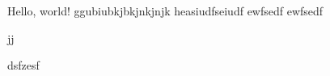 \documentclass{article}
\begin{document}
Hello, world!
ggubiubkjbkjnkjnjk
heasiudfseiudf
ewfsedf
ewfsedf


jj

dsfzesf
\end{document}

